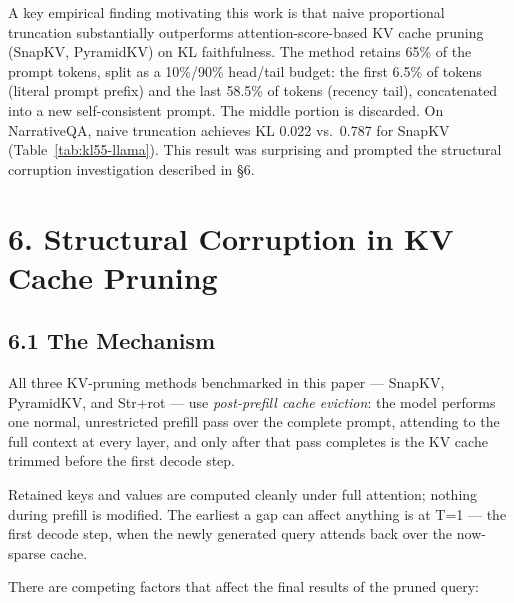 \documentclass[10pt,letterpaper]{article}
\begin{document}
A key empirical finding motivating this work is that naive proportional
truncation substantially outperforms attention-score-based KV cache
pruning (SnapKV, PyramidKV) on KL faithfulness. The method retains 65\%
of the prompt tokens, split as a 10\%/90\% head/tail budget: the first
6.5\% of tokens (literal prompt prefix) and the last 58.5\% of tokens
(recency tail), concatenated into a new self-consistent prompt. The
middle portion is discarded. On NarrativeQA, naive truncation achieves
KL 0.022 vs.~0.787 for SnapKV (Table~\ref{tab:kl55-llama}). This
result was surprising and prompted the structural corruption
investigation described in §6.

\hypertarget{structural-corruption-in-kv-cache-pruning}{%
\section{6. Structural Corruption in KV Cache
Pruning}\label{structural-corruption-in-kv-cache-pruning}}

\hypertarget{the-mechanism}{%
\subsection{6.1 The Mechanism}\label{the-mechanism}}

All three KV-pruning methods benchmarked in this paper --- SnapKV,
PyramidKV, and Str+rot --- use \emph{post-prefill cache
eviction}: the model performs one normal, unrestricted prefill pass over
the complete prompt, attending to the full context at every layer, and
only after that pass completes is the KV cache trimmed before the first
decode step. 

Retained keys and values are computed cleanly under full
attention; nothing during prefill is modified. The earliest a gap can
affect anything is at T=1 --- the first decode step, when the newly
generated query attends back over the now-sparse cache.

There are competing factors that affect the final results of the pruned query:
\end{document}
